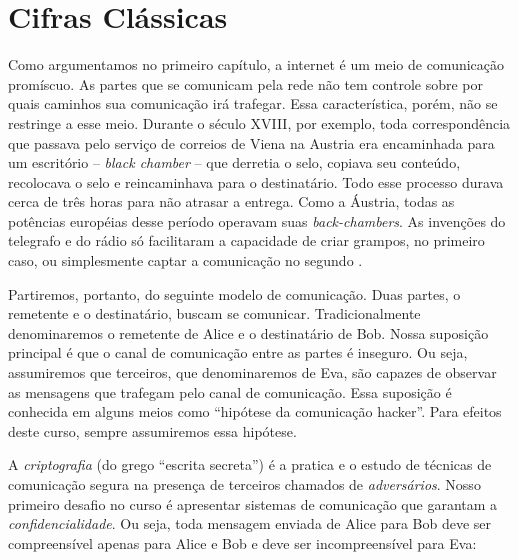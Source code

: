 \chapter{Cifras Clássicas}
\label{cha:cifras-classicas}

Como argumentamos no primeiro capítulo, a internet é um meio de comunicação promíscuo.
As partes que se comunicam pela rede não tem controle sobre por quais caminhos sua comunicação irá trafegar.
Essa característica, porém, não se restringe a esse meio.
Durante o século XVIII, por exemplo, toda correspondência que passava pelo serviço de correios de Viena na Austria era encaminhada para um escritório -- {\em black chamber} -- que derretia o selo, copiava seu conteúdo, recolocava o selo e reincaminhava para o destinatário.
Todo esse processo durava cerca de três horas para não atrasar a entrega.
Como a Áustria, todas as potências européias desse período operavam suas {\em back-chambers}.
As invenções do telegrafo e do rádio só facilitaram a capacidade de criar grampos, no primeiro caso, ou simplesmente captar a comunicação no segundo \cite{Kahn96}.

Partiremos, portanto, do seguinte modelo de comunicação.
Duas partes, o remetente e o destinatário, buscam se comunicar.
Tradicionalmente denominaremos o remetente de Alice e o destinatário de Bob.
Nossa suposição principal é que o canal de comunicação entre as partes é inseguro.
Ou seja, assumiremos que terceiros, que denominaremos de Eva, são capazes de observar as mensagens que trafegam pelo canal de comunicação.
Essa suposição é conhecida em alguns meios como ``hipótese da comunicação hacker''.
Para efeitos deste curso, sempre assumiremos essa hipótese.

A {\em criptografia} (do grego ``escrita secreta'') é a pratica e o estudo de técnicas de comunicação segura na presença de terceiros chamados de {\em adversários}.
Nosso primeiro desafio no curso é apresentar sistemas de comunicação que garantam a {\em confidencialidade}.
Ou seja, toda mensagem enviada de Alice para Bob deve ser compreensível apenas para Alice e Bob e deve ser incompreensível para Eva:
\begin{center}
\end{center}


